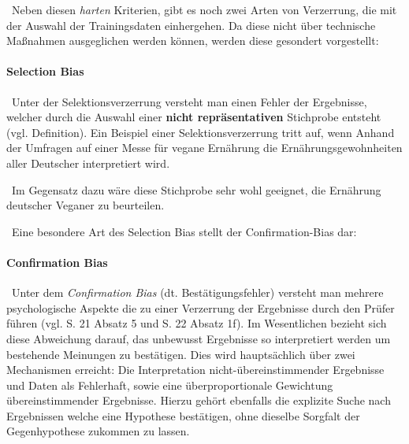 ~\newline Neben diesen \textit{harten} Kriterien, gibt es noch zwei Arten von Verzerrung, die mit der Auswahl der Trainingsdaten einhergehen. Da diese nicht über technische Maßnahmen ausgeglichen werden können, werden diese gesondert vorgestellt:
\paragraph{Selection Bias} ~\newline  Unter der Selektionsverzerrung versteht man einen Fehler der Ergebnisse, welcher durch die Auswahl einer \textbf{nicht repräsentativen} Stichprobe entsteht (vgl. \cite{SelectionBias} Definition). Ein Beispiel einer Selektionsverzerrung tritt auf, wenn Anhand der Umfragen auf einer Messe für vegane Ernährung die Ernährungsgewohnheiten aller Deutscher interpretiert wird. 

~\newline  Im Gegensatz dazu wäre diese Stichprobe sehr wohl geeignet, die Ernährung deutscher Veganer zu beurteilen.  

~\newline Eine besondere Art des Selection Bias stellt der Confirmation-Bias dar:
\paragraph{Confirmation Bias} ~\newline  Unter dem \textit{Confirmation Bias} (dt. Bestätigungsfehler) versteht man mehrere psychologische Aspekte die zu einer Verzerrung der Ergebnisse durch den Prüfer führen (vgl. \cite{ConfirmationBias} S. 21 Absatz 5 und S. 22 Absatz 1f). Im Wesentlichen bezieht sich diese Abweichung darauf, das unbewusst Ergebnisse so interpretiert werden um bestehende Meinungen zu bestätigen. Dies wird hauptsächlich über zwei Mechanismen erreicht: Die Interpretation nicht-übereinstimmender Ergebnisse und Daten als Fehlerhaft, sowie eine überproportionale Gewichtung übereinstimmender Ergebnisse. Hierzu gehört ebenfalls die explizite Suche nach Ergebnissen welche eine Hypothese bestätigen, ohne dieselbe Sorgfalt der Gegenhypothese zukommen zu lassen. 
